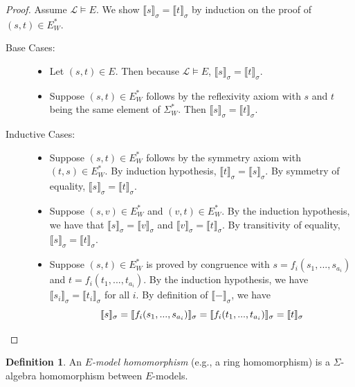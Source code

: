 \documentclass{msthesis}
\theoremstyle{definition}
\newtheorem{definition}[theorem]{Definition}
\newcommand{\semof}[1]{\llbracket{#1}\rrbracket}
\newcommand{\Lmod}{\mathscr{L}}
\begin{document}
\begin{proof}
    Assume $\Lmod \models E$.
    We show $\semof{s}_\sigma = \semof{t}_\sigma$ by induction on the proof of $(s,t) \in E^*_W$.

    \begin{description}
        \item[Base Cases: ]\hfill
        \begin{itemize}[nosep]
            \item Let $(s,t) \in E$. Then because $\Lmod \models E$, $\semof{s}_\sigma = \semof{t}_\sigma$.
            \item Suppose $(s,t) \in E^*_W$ follows by the reflexivity axiom with $s$ and $t$ 
            being the same element of $\Sigma^*_W$.  Then $\semof{s}_\sigma = \semof{t}_\sigma$.        
        \end{itemize}
        \item[Inductive Cases:]\hfill
        \begin{itemize}[nosep]
            \item Suppose $(s,t) \in E^*_W$ follows by the symmetry axiom with $(t,s) \in E^*_W$. By induction hypothesis, $\semof{t}_\sigma = \semof{s}_\sigma$.
            By symmetry of equality,  $\semof{s}_\sigma = \semof{t}_\sigma$. 
            \item Suppose $(s, v) \in E^*_W$ and $(v, t) \in E^*_W$.  By the induction hypothesis, we have that $\semof{s}_\sigma = \semof{v}_\sigma$
            and
            $\semof{v}_\sigma = \semof{t}_\sigma$.
            By transitivity of equality,
            $\semof{s}_\sigma = \semof{t}_\sigma$.
            \item Suppose $(s, t) \in E^*_W$ is proved by congruence with $s = f_i(s_1, ..., s_{a_i})$ and $t = f_i(t_1, ..., t_{a_i})$. By the induction hypothesis, we have $\semof{s_i}_\sigma = \semof{t_i}_\sigma$ for all $i$.  By definition of $\semof{-}_\sigma$, we have
            \[ \semof{s}_\sigma = \semof{f_i(s_1, ..., s_{a_i})}_\sigma = \semof{f_i(t_1, ..., t_{a_i})}_\sigma = \semof{t}_\sigma \qedhere\]
        \end{itemize}
    \end{description}
\end{proof}

\begin{definition}
    An \emph{$E$-model homomorphism} (e.g., a ring homomorphism) is a $\Sigma$-algebra homomorphism between $E$-models.
\end{definition}
\end{document}
